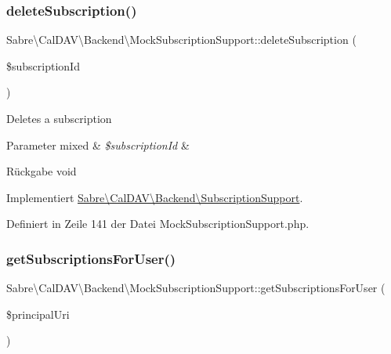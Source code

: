 \subsubsection{\texorpdfstring{delete\+Subscription()}{deleteSubscription()}}
{\footnotesize\ttfamily Sabre\textbackslash{}\+Cal\+D\+A\+V\textbackslash{}\+Backend\textbackslash{}\+Mock\+Subscription\+Support\+::delete\+Subscription (\begin{DoxyParamCaption}\item[{}]{\$subscription\+Id }\end{DoxyParamCaption})}

Deletes a subscription


\begin{DoxyParams}[1]{Parameter}
mixed & {\em \$subscription\+Id} & \\
\hline
\end{DoxyParams}
\begin{DoxyReturn}{Rückgabe}
void 
\end{DoxyReturn}


Implementiert \mbox{\hyperlink{interface_sabre_1_1_cal_d_a_v_1_1_backend_1_1_subscription_support_adaaf00fe6295b0809c84e9b78cdae5e3}{Sabre\textbackslash{}\+Cal\+D\+A\+V\textbackslash{}\+Backend\textbackslash{}\+Subscription\+Support}}.



Definiert in Zeile 141 der Datei Mock\+Subscription\+Support.\+php.

\mbox{\label{class_sabre_1_1_cal_d_a_v_1_1_backend_1_1_mock_subscription_support_a6586395148ea71f7d9bf101f8b9ee517}} 
\subsubsection{\texorpdfstring{get\+Subscriptions\+For\+User()}{getSubscriptionsForUser()}}
{\footnotesize\ttfamily Sabre\textbackslash{}\+Cal\+D\+A\+V\textbackslash{}\+Backend\textbackslash{}\+Mock\+Subscription\+Support\+::get\+Subscriptions\+For\+User (\begin{DoxyParamCaption}\item[{}]{\$principal\+Uri }\end{DoxyParamCaption})}

